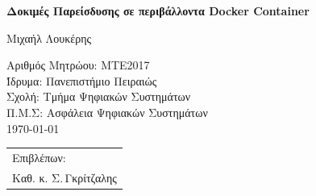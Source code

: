 \begin{titlepage}
    \vspace*{-3cm}
    
    \vspace*{5cm}
    \begin{center}
    \Huge\bfseries Δοκιμές Παρείσδυσης σε περιβάλλοντα \textlatin{Docker Container}
    
    \vspace*{2cm}
    \large 
     Μιχαήλ Λουκέρης
    \end{center}
    
    \enlargethispage{3cm}
    \vfill
    \parbox[t]{0.60\textwidth}{%
        Αριθμός Μητρώου: ΜΤΕ2017            \\
        Ίδρυμα: Πανεπιστήμιο Πειραιώς       \\
        Σχολή: Τμήμα Ψηφιακών Συστημάτων    \\
        Π.Μ.Σ: Ασφάλεια Ψηφιακών Συστημάτων \\

        \today
      }%
    \hfill
    \begin{tabular}[t]{l@{}}%
    Επιβλέπων:\\
      Καθ. κ. Σ.\,Γκρίτζαλης
    \end{tabular}
    \end{titlepage}
    